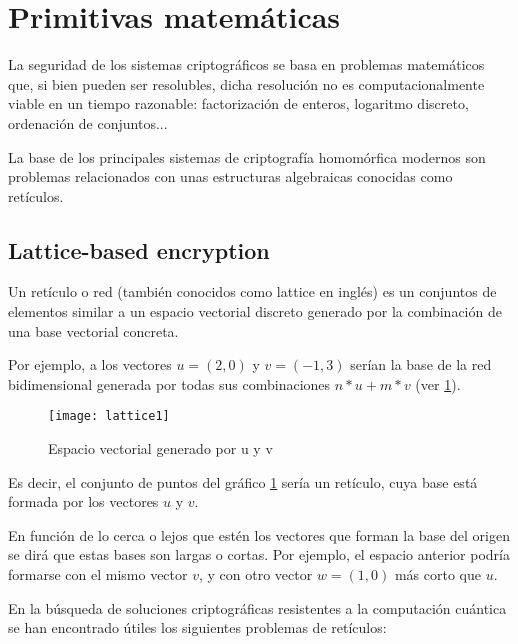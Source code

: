 \section{Primitivas matemáticas}

La seguridad de los sistemas criptográficos se basa en problemas matemáticos que, si bien pueden ser resolubles, dicha resolución no es computacionalmente viable en un tiempo razonable: factorización de enteros, logaritmo discreto, ordenación de conjuntos...

La base de los principales sistemas de criptografía homomórfica modernos son problemas relacionados con unas estructuras algebraicas conocidas como retículos.

\subsection{Lattice-based encryption}

Un retículo o red (también conocidos como lattice en inglés) es un conjuntos de elementos similar a un espacio vectorial discreto generado por la combinación de una base vectorial concreta.

Por ejemplo, a los vectores $u = (2, 0)$ y $v = (-1, 3)$ serían la base de la red bidimensional generada por todas sus combinaciones $n*u + m*v$ (ver \ref{fig:lattice1}).

\begin{figure}[h]
  \caption{Espacio vectorial generado por u y v}
  \label{fig:lattice1}
  \texttt{[image: lattice1]}
\end{figure}

Es decir, el conjunto de puntos del gráfico \ref{fig:lattice1} sería un retículo, cuya base está formada por los vectores $u$ y $v$.

En función de lo cerca o lejos que estén los vectores que forman la base del origen se dirá que estas bases son largas o cortas\cite{wickr_what_2018}. Por ejemplo, el espacio anterior podría formarse con el mismo vector $v$, y con otro vector $w = (1, 0)$ más corto que $u$.

En la búsqueda de soluciones criptográficas resistentes a la computación cuántica se han encontrado útiles los siguientes problemas de retículos:

